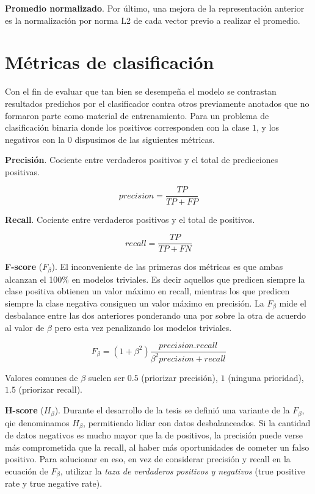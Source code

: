 \textbf{Promedio normalizado}. Por último, una mejora de la representación
anterior es la normalización por norma L2 de cada vector previo a realizar el
promedio.

\section{Métricas de clasificación}

Con el fin de evaluar que tan bien se desempeña el modelo se contrastan
resultados predichos por el clasificador contra otros previamente anotados que
no formaron parte como material de entrenamiento. Para un problema de
clasificación binaria donde los positivos corresponden con la clase $1$, y los
negativos con la $0$ dispusimos de las siguientes métricas.

\textbf{Precisión}. Cociente entre verdaderos positivos y el total de
predicciones positivas. 

\begin{equation}
    precision = \frac{TP}{TP + FP}
\end{equation}

\textbf{Recall}. Cociente entre verdaderos positivos y el total de positivos.

\begin{equation}
    recall = \frac{TP}{TP + FN}
\end{equation}

\textbf{F-score} ($F_{\beta}$). El inconveniente de las primeras dos métricas es
que ambas alcanzan el 100\% en modelos triviales. Es decir aquellos que predicen
siempre la clase positiva obtienen un valor máximo en recall, mientras los que
predicen siempre la clase negativa consiguen un valor máximo en precisión. La
$F_{\beta}$ mide el desbalance entre las dos anteriores ponderando una por sobre
la otra de acuerdo al valor de $\beta$ pero esta vez penalizando los modelos
triviales. 

\begin{equation}
    F_{\beta} = (1 + \beta^2) \frac{precision . recall}{\beta^2 precision + recall}
\end{equation}

Valores comunes de $\beta$ suelen ser $0.5$ (priorizar precisión), $1$ (ninguna
prioridad), $1.5$ (priorizar recall).

\textbf{H-score} ($H_{\beta}$). Durante el desarrollo de la tesis se definió una
variante de la $F_{\beta}$, qie denominamos $H_{\beta}$, permitiendo lidiar con
datos desbalanceados. Si la cantidad de datos negativos es mucho mayor que la de
positivos, la precisión puede verse más comprometida que la recall, al haber más
oportunidades de cometer un falso positivo. Para solucionar en eso, en vez de
considerar precisión y recall en la ecuación de $F_{\beta}$, utilizar la
\emph{taza de verdaderos positivos y negativos} (true positive rate y true
negative rate).


